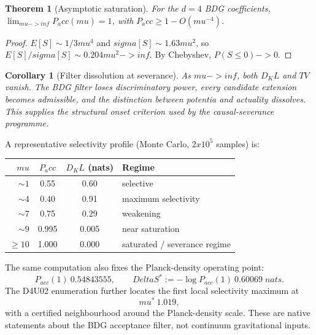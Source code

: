 \documentclass[11pt]{article}
\def\Delta{Delta}%
\def\sigma{sigma}%
\def\mu{mu}%
\def\mathrm#1{#1}%
\def\mathbb#1{#1}%
\def\frac#1#2{#1/#2}%
\def\times{x}%
\def\approx{~}%
\def\to{->}%
\def\infty{inf}%
\def\Pacc{P_acc}%
\def\Dkl{D_KL}%
\def\TV{TV}%
\newtheorem{theorem}{Theorem}
\newtheorem{corollary}{Corollary}
\newcommand{\Pacc}{\ensuremath{P_{\mathrm{acc}}}}
\newcommand{\Dkl}{\ensuremath{D_{\mathrm{KL}}}}
\newcommand{\TV}{\ensuremath{\mathrm{TV}}}
\begin{document}
\begin{theorem}[Asymptotic saturation]
\label{thm:saturation}
For the $d=4$ BDG coefficients, $\lim_{\mu\to\infty}\Pacc(\mu)=1$, with $\Pacc\ge 1-O(\mu^{-4})$.
\end{theorem}
\begin{proof}
$\mathbb{E}[S]\sim\frac{1}{3}\mu^4$ and $\sigma[S]\sim 1.63\mu^2$, so $\mathbb{E}[S]/\sigma[S]\sim 0.204\mu^2\to\infty$. By Chebyshev, $\mathbb{P}(S\le 0)\to 0$.
\end{proof}

\begin{corollary}[Filter dissolution at severance]
As $\mu\to\infty$, both $\Dkl$ and $\TV$ vanish. The BDG filter loses discriminatory power, every candidate extension becomes admissible, and the distinction between potentia and actuality dissolves. This supplies the structural onset criterion used by the causal-severance programme.
\end{corollary}

A representative selectivity profile (Monte Carlo, $2\times 10^5$ samples) is:

\begin{center}
\begin{tabular}{rccl}
\toprule
$\mu$ & $\Pacc$ & $\Dkl$ (nats) & Regime \\
\midrule
$\sim 1$ & 0.55 & 0.60 & selective \\
$\sim 4$ & 0.40 & 0.91 & maximum selectivity \\
$\sim 7$ & 0.75 & 0.29 & weakening \\
$\sim 9$ & 0.995 & 0.005 & near saturation \\
$\ge 10$ & 1.000 & 0.000 & saturated / severance regime \\
\bottomrule
\end{tabular}
\end{center}

The same computation also fixes the Planck-density operating point:
\begin{equation}
P_{\mathrm{acc}}(1)\approx 0.54843555,
\qquad
\Delta S^*:=-\log P_{\mathrm{acc}}(1)\approx0.60069\;\mathrm{nats}.
\end{equation}
The D4U02 enumeration further locates the first local selectivity maximum at
\begin{equation}
\mu^*\approx1.019,
\end{equation}
with a certified neighbourhood around the Planck-density scale. These are native statements about the BDG acceptance filter, not continuum gravitational inputs.
\end{document}
